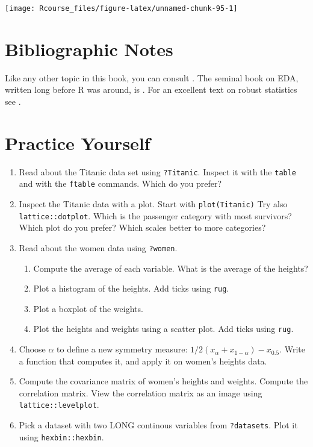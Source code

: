 \documentclass[]{book}
\providecommand{\tightlist}{%
  \setlength{\itemsep}{0pt}\setlength{\parskip}{0pt}}
\theoremstyle{definition}
\theoremstyle{definition}
\theoremstyle{definition}
\theoremstyle{remark}
\begin{document}
\texttt{[image: Rcourse\_files/figure-latex/unnamed-chunk-95-1]}

\section{Bibliographic Notes}\label{bibliographic-notes-2}

Like any other topic in this book, you can consult
\citet{venables2013modern}. The seminal book on EDA, written long before
R was around, is \citet{tukey1977exploratory}. For an excellent text on
robust statistics see \citet{wilcox2011introduction}.

\section{Practice Yourself}\label{practice-yourself-2}

\begin{enumerate}
\def\labelenumi{\arabic{enumi}.}
\item
  Read about the Titanic data set using \texttt{?Titanic}. Inspect it
  with the \texttt{table} and with the \texttt{ftable} commands. Which
  do you prefer?
\item
  Inspect the Titanic data with a plot. Start with
  \texttt{plot(Titanic)} Try also \texttt{lattice::dotplot}. Which is
  the passenger category with most survivors? Which plot do you prefer?
  Which scales better to more categories?
\item
  Read about the women data using \texttt{?women}.

  \begin{enumerate}
  \def\labelenumii{\arabic{enumii}.}
  \tightlist
  \item
    Compute the average of each variable. What is the average of the
    heights?
  \item
    Plot a histogram of the heights. Add ticks using \texttt{rug}.
  \item
    Plot a boxplot of the weights.
  \item
    Plot the heights and weights using a scatter plot. Add ticks using
    \texttt{rug}.
  \end{enumerate}
\item
  Choose \(\alpha\) to define a new symmetry measure:
  \(1/2(x_\alpha+x_{1-\alpha})-x_{0.5}\). Write a function that computes
  it, and apply it on women's heights data.
\item
  Compute the covariance matrix of women's heights and weights. Compute
  the correlation matrix. View the correlation matrix as an image using
  \texttt{lattice::levelplot}.
\item
  Pick a dataset with two LONG continous variables from
  \texttt{?datasets}. Plot it using \texttt{hexbin::hexbin}.
\end{enumerate}
\end{document}

